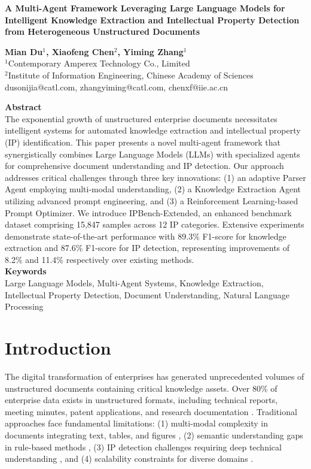 \documentclass[11pt,a4paper]{article}
\newcommand{\mytitle}[1]{%
  \begin{center}
    {\fontsize{16}{20}\selectfont\bfseries #1}
  \end{center}
  \vspace{12pt}
}
\newcommand{\myauthors}[3]{%
  \begin{center}
    {\fontsize{11}{13}\selectfont\bfseries #1}\\[6pt]
    {\fontsize{10}{12}\selectfont #2}\\[4pt]
    {\fontsize{9}{11}\selectfont\ttfamily #3}\\[8pt]
  \end{center}
}
\newcommand{\myabstract}[1]{%
  {\fontsize{11}{13}\selectfont\bfseries Abstract}\\[4pt]
  {\fontsize{9}{11}\selectfont #1}\\[8pt]
}
\newcommand{\mykeywords}[1]{%
  {\fontsize{11}{13}\selectfont\bfseries Keywords}\\[4pt]
  {\fontsize{9}{11}\selectfont #1}\\[12pt]
}
\begin{document}
\mytitle{A Multi-Agent Framework Leveraging Large Language Models for Intelligent Knowledge Extraction and Intellectual Property Detection from Heterogeneous Unstructured Documents}

\myauthors{Mian Du$^1$, Xiaofeng Chen$^2$, Yiming Zhang$^1$}{%
  $^1$Contemporary Amperex Technology Co., Limited\\
  $^2$Institute of Information Engineering, Chinese Academy of Sciences%
}{%
  dusonijia@catl.com, zhangyiming@catl.com, chenxf@iie.ac.cn%
}

\myabstract{%
The exponential growth of unstructured enterprise documents necessitates intelligent systems for automated knowledge extraction and intellectual property (IP) identification. This paper presents a novel multi-agent framework that synergistically combines Large Language Models (LLMs) with specialized agents for comprehensive document understanding and IP detection. Our approach addresses critical challenges through three key innovations: (1) an adaptive Parser Agent employing multi-modal understanding, (2) a Knowledge Extraction Agent utilizing advanced prompt engineering, and (3) a Reinforcement Learning-based Prompt Optimizer. We introduce IPBench-Extended, an enhanced benchmark dataset comprising 15,847 samples across 12 IP categories. Extensive experiments demonstrate state-of-the-art performance with 89.3\% F1-score for knowledge extraction and 87.6\% F1-score for IP detection, representing improvements of 8.2\% and 11.4\% respectively over existing methods.%
}

\mykeywords{Large Language Models, Multi-Agent Systems, Knowledge Extraction, Intellectual Property Detection, Document Understanding, Natural Language Processing}


\section{Introduction}

The digital transformation of enterprises has generated unprecedented volumes of unstructured documents containing critical knowledge assets. Over 80\% of enterprise data exists in unstructured formats, including technical reports, meeting minutes, patent applications, and research documentation \citep{gandomi2015beyond}. Traditional approaches face fundamental limitations: (1) multi-modal complexity in documents integrating text, tables, and figures \citep{huang2022layoutlmv3}, (2) semantic understanding gaps in rule-based methods \citep{qiu2020pre}, (3) IP detection challenges requiring deep technical understanding \citep{aristodemou2024patent}, and (4) scalability constraints for diverse domains \citep{brown2020language}.
\end{document}
